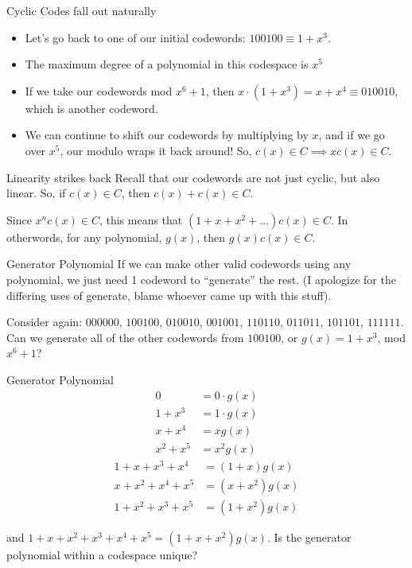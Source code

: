 \documentclass[aspectratio=169]{beamer}
\begin{document}
\begin{frame}{Cyclic Codes fall out naturally}
    \begin{itemize}
        \item Let's go back to one of our initial codewords: $100100 \equiv 1 + x^3$. \pause 
        \item The maximum degree of a polynomial in this codespace is $x^5$
        \item If we take our codewords mod $x^6 + 1$, then $x \cdot (1 + x^3) = x + x^4 \equiv 010010$, which is another codeword. \pause 
        \item  We can continue to shift our codewords by multiplying by $x$, and if we go over $x^5$, our modulo wraps it back around! So, $c(x) \in C \implies x c(x) \in C$. 
    \end{itemize}
\end{frame}

\begin{frame}{Linearity strikes back}
    Recall that our codewords are not just cyclic, but also linear. So, if $c(x) \in C$, then $c(x) + c(x) \in C$. \pause
    
    Since $x^nc(x) \in C$, this means that $(1 + x + x^2 + \ldots) c(x) \in C$. In otherwords, for any polynomial, $g(x)$, then $g(x)c(x) \in C$. 
\end{frame}

\begin{frame}{Generator Polynomial}
    If we can make other valid codewords using any polynomial, we just need 1 codeword to ``generate'' the rest. (I apologize for the differing uses of generate, blame whoever came up with this stuff). \pause 

    Consider again: $000000$, $100100$, $010010$, $001001$, $110110$, $011011$, $101101$, $111111$. Can we generate all of the other codewords from $100100$, or $g(x) = 1 + x^3$, mod $x^6 + 1$? 
\end{frame}

\begin{frame}{Generator Polynomial}
    \begin{align*}
    0 &= 0 \cdot g(x) \\
    1 + x^3 &= 1 \cdot g(x) \\ 
    x + x^4 &= xg(x) \\
    x^2 + x^5 &= x^2g(x) 
    \end{align*} \pause
    \begin{align*}
    1 + x + x^3 + x^4 &= (1 + x)g(x) \\ 
    x + x^2 + x^4 + x^5 &= (x + x^2)g(x) \\
    1 + x^2 + x^3 + x^5 &= (1 + x^2)g(x) 
    \end{align*}
    
    and $1 + x + x^2 + x^3 + x^4 + x^5 = (1 + x + x^2)g(x)$. Is the generator polynomial within a codespace unique? 
\end{frame}
\end{document}
